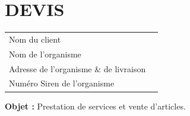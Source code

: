 \documentclass[11pt,a4paper]{article}
\begin{document}
\begin{minipage}[t]{0.5\textwidth}
    \hspace*{0pt}\vspace*{\fill}
    \section*{\LARGE DEVIS}
\end{minipage}\begin{minipage}[t]{0.5\textwidth}
    \begin{framed}
        \begin{tabular}{ll}
            Nom du client                          \\
            Nom de l'organisme                     \\
            Adresse de l'organisme \& de livraison \\
            Numéro Siren de l'organisme            \\
        \end{tabular}
    \end{framed}
    \vspace{0.1cm}
\end{minipage}



\textbf{Objet :} Prestation de services et vente d'articles.

\vspace{0.5cm}
\end{document}
